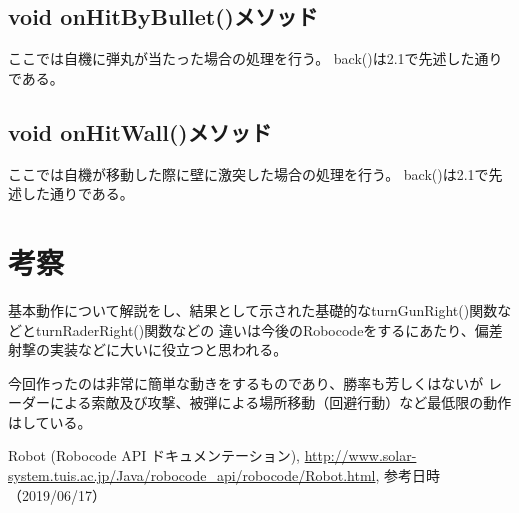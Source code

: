 \documentclass[a4j, titlepage]{jsarticle}
\begin{document}
\subsection{void onHitByBullet()メソッド}
ここでは自機に弾丸が当たった場合の処理を行う。
back()は2.1で先述した通りである。

\subsection{void onHitWall()メソッド}
ここでは自機が移動した際に壁に激突した場合の処理を行う。
back()は2.1で先述した通りである。

\section{考察}

基本動作について解説をし、結果として示された基礎的なturnGunRight()関数などとturnRaderRight()関数などの
違いは今後のRobocodeをするにあたり、偏差射撃の実装などに大いに役立つと思われる。

今回作ったのは非常に簡単な動きをするものであり、勝率も芳しくはないが
レーダーによる索敵及び攻撃、被弾による場所移動（回避行動）など最低限の動作はしている。

\begin{thebibliography}{9}
    Robot (Robocode API ドキュメンテーション),
    \url{http://www.solar-system.tuis.ac.jp/Java/robocode_api/robocode/Robot.html},
    参考日時（2019/06/17）
\end{thebibliography}
\end{document}
